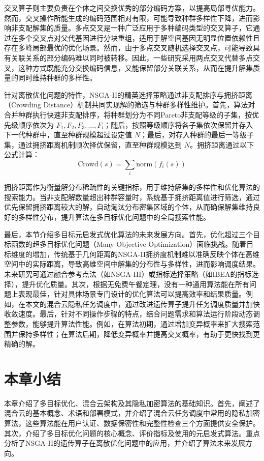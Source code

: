 交叉算子则主要负责在个体之间交换优秀的部分编码方案，以提高局部寻优能力。然而，交叉操作所能生成的编码范围相对有限，可能导致种群多样性下降，进而影响非支配解集的质量。多点交叉是一种广泛应用于多种编码类型的交叉算子，它通过在多个交叉点对父代基因进行分块重组，适用于解空间基因无明显位置依赖性且存在多峰局部最优的优化场景。然而，由于多点交叉随机选择交叉点，可能导致具有关联关系的部分编码难以同时被转移。因此，一些研究采用两点交叉代替多点交叉，这种方式既能充分交换编码信息，又能保留部分关联关系，从而在提升解集质量的同时维持种群的多样性。

针对离散优化问题的特性，NSGA-II的精英选择策略通过非支配排序与拥挤距离（Crowding Distance）机制共同实现解的筛选与种群多样性维护。首先，算法对合并种群执行快速非支配排序，将种群划分为不同Pareto非支配等级的子集，按优先级顺序依次为 \(F_1, F_2, F_3, \dots, F_l\)；随后，按照等级顺序将各子集依次保留并存入下一代种群中，直至种群规模超过设定值 \(N\)；最后，对存入种群的最后一等级子集，通过拥挤距离机制顺次择优保留，直至种群规模达到 \(N\)。拥挤距离通过以下公式计算：
\begin{equation}
    \text{Crowd}(s) = \sum_i \text{norm}(f_i(s))
    \label{eq:nsga2-crowd}
\end{equation}

拥挤距离作为衡量解分布稀疏性的关键指标，用于维持解集的多样性和优化算法的搜索能力。当非支配解数量超出种群容量时，系统基于拥挤距离值进行筛选，通过优先保留拥挤距离较大的解，自动淘汰分布密集区域的个体，从而确保解集维持良好的多样性分布，提升算法在多目标优化问题中的全局搜索性能。

最后，本节介绍多目标元启发式优化算法的未来发展方向。首先，优化超过三个目标函数的超多目标优化问题（Many Objective Optimization）面临挑战。随着目标维度的增加，传统基于几何距离的NSGA-II拥挤度机制难以准确反映个体在高维空间中的实际距离，导致高维空间中解集的分布性与多样性，进而影响调度结果。未来研究可通过融合参考点法（如NSGA-III）或指标选择策略（如IBEA的指标选择\cite{zhengIndicatorBasedMultiobjective2024}），提升优化质量。其次，根据无免费午餐定理，没有一种通用算法能在所有问题上表现最佳，针对具体场景专门设计的优化算法可以提高效率和结果质量。例如，在本文的混合云隐私任务调度中，通过改进遗传算子提升任务调度质量并加快收敛速度。最后，针对不同操作步骤的特点，结合问题需求和算法运行阶段动态调整参数，能够提升算法性能。例如，在算法初期，通过增加变异概率来扩大搜索范围并保持多样性；在算法后期，降低变异概率并提高交叉概率，有助于更快找到更精确的解。

\section{本章小结}

本章介绍了多目标优化、混合云架构及其隐私加密算法的基础知识。首先，阐述了混合云的基本概念、术语和部署模式，并介绍了混合云任务调度中常用的隐私加密算法，这些算法能在用户认证、数据保密性和完整性检查三个方面提供安全保护。其次，介绍了多目标优化问题的核心概念、评价指标及使用的元启发式算法。重点分析了NSGA-II的遗传算子在离散优化问题中的应用，并介绍了算法未来发展方向。

